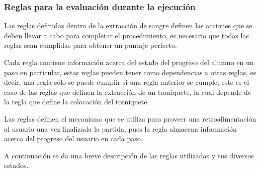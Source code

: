 \subsubsection{Reglas para la evaluación durante la ejecución}



Las reglas definidas dentro de la extracción de sangre definen las acciones
que se deben llevar a cabo para completar el procedimiento, es necesario que
todas las reglas sean cumplidas para obtener un puntaje perfecto.

Cada regla contiene información acerca del estado del progreso del alumno en un
paso en particular, estas reglas pueden tener como dependencias a otras reglas,
es decir, una regla sólo se puede cumplir si una regla anterior se cumple, este
es el caso de las reglas que definen la extracción de un torniquete, la cual
depende de la regla que define la colocación del torniquete.  

Las reglas definen el mecanismo que se utiliza para proveer una retroalimentación
al usuario una vez finalizada la partida, pues la regla almacena información 
acerca del progreso del usuario en cada paso.

A continuación se da una breve descripción de las reglas utilizadas y sus
diversos estados.



